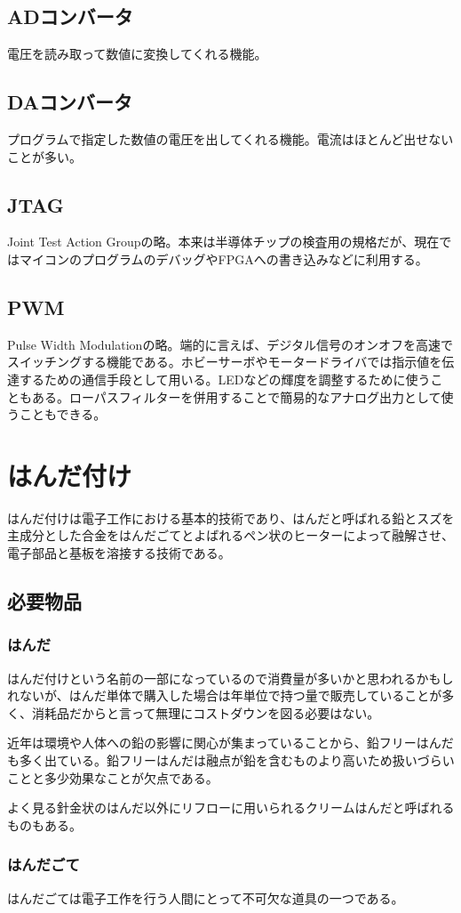 \documentclass[a4paper,titlepage,here]{ujarticle}
\begin{document}
\subsection{ADコンバータ}
電圧を読み取って数値に変換してくれる機能。
\subsection{DAコンバータ}
プログラムで指定した数値の電圧を出してくれる機能。電流はほとんど出せないことが多い。
\subsection{JTAG}
Joint Test Action Groupの略。本来は半導体チップの検査用の規格だが、現在ではマイコンのプログラムのデバッグやFPGAへの書き込みなどに利用する。
\subsection{PWM}
Pulse Width Modulationの略。端的に言えば、デジタル信号のオンオフを高速でスイッチングする機能である。ホビーサーボやモータードライバでは指示値を伝達するための通信手段として用いる。LEDなどの輝度を調整するために使うこともある。ローパスフィルターを併用することで簡易的なアナログ出力として使うこともできる。
\section{はんだ付け}
はんだ付けは電子工作における基本的技術であり、はんだと呼ばれる鉛とスズを主成分とした合金をはんだごてとよばれるペン状のヒーターによって融解させ、電子部品と基板を溶接する技術である。
\subsection{必要物品}
\subsubsection{はんだ}
はんだ付けという名前の一部になっているので消費量が多いかと思われるかもしれないが、はんだ単体で購入した場合は年単位で持つ量で販売していることが多く、消耗品だからと言って無理にコストダウンを図る必要はない。

近年は環境や人体への鉛の影響に関心が集まっていることから、鉛フリーはんだも多く出ている。鉛フリーはんだは融点が鉛を含むものより高いため扱いづらいことと多少効果なことが欠点である。

よく見る針金状のはんだ以外にリフローに用いられるクリームはんだと呼ばれるものもある。
\subsubsection{はんだごて}
はんだごては電子工作を行う人間にとって不可欠な道具の一つである。
\end{document}

